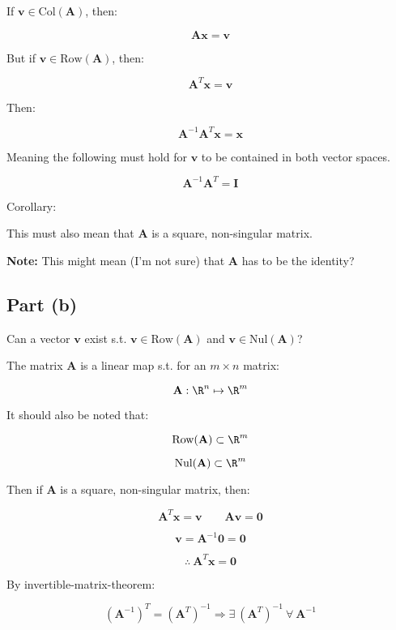 \documentclass{article}
\begin{document}
If $\mathbf{v} \in \text{Col}(\mathbf{A})$, then:

\[%
    \mathbf{A}\mathbf{x}=\mathbf{v}
\]%

But if $\mathbf{v} \in \text{Row}(\mathbf{A})$, then:

\[%
    \mathbf{A}^{T}\mathbf{x}
    =
    \mathbf{v}
\]%

Then:

\[%
    \mathbf{A}^{-1}\mathbf{A}^{T}\mathbf{x}=\mathbf{x}
\]%

Meaning the following must hold for $\mathbf{v}$ to be contained in both vector
spaces.

\[%
    \mathbf{A}^{-1}\mathbf{A}^{T} = \mathbf{I}
\]%

Corollary:

This must also mean that $\mathbf{A}$ is a square, non-singular matrix.

\textbf{Note:} This might mean (I'm not sure) that $\mathbf{A}$ has to be the
identity?

\subsection{Part (b)} 
Can a vector $\mathbf{v}$ exist s.t. $\mathbf{v} \in \text{Row}(\mathbf{A})$ and
$\mathbf{v} \in \text{Nul}(\mathbf{A})$?

The matrix $\mathbf{A}$ is a linear map s.t. for an $m \times n$ matrix:

\[%
    \mathbf{A}: \R^{n} \mapsto \R^{m} 
\]%

It should also be noted that:

\[%
    \text{Row}(\mathbf{A}) \subset \R^{m}
\]%

\[%
    \text{Nul}(\mathbf{A}) \subset \R^{m}
\]%

Then if $\mathbf{A}$ is a square, non-singular matrix, then:

\[%
    \mathbf{A}^{T}\mathbf{x}
    =
    \mathbf{v}
    \qquad
    \mathbf{A}\mathbf{v}
    =
    \mathbf{0}
\]%

\[%
    \mathbf{v}
    =
    \mathbf{A}^{-1}\mathbf{0}
    =
    \mathbf{0}
\]%

\[%
    \therefore \ 
    \mathbf{A}^{T}\mathbf{x}
    =
    \mathbf{0}
\]%

By invertible-matrix-theorem:

\[%
    (\mathbf{A}^{-1})^{T} 
    =
    (\mathbf{A}^{T})^{-1}
    \Rightarrow 
    \exists \
    (\mathbf{A}^{T})^{-1}
    \ \forall \
    \mathbf{A}^{-1}
\]%
\end{document}
